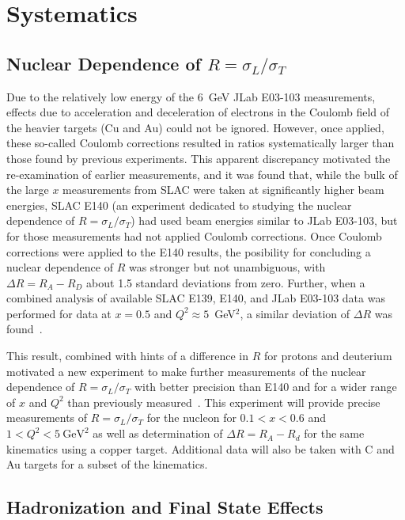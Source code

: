 \section{Systematics\label{sec:systematics}}
\subsection{Nuclear Dependence of $R=\sigma_L/\sigma_T$}


Due to the relatively low energy of the 6~GeV JLab E03-103 measurements, effects due to acceleration and
deceleration of electrons in the Coulomb field of the heavier targets (Cu and Au) could not be ignored.
However, once applied, these so-called Coulomb corrections resulted in ratios systematically larger
than those found by previous experiments.  This apparent discrepancy motivated the re-examination of
earlier measurements, and it was found that, while the bulk of the large $x$ measurements from SLAC
were taken at significantly higher beam energies, SLAC E140 (an experiment dedicated to studying
the nuclear dependence of $R=\sigma_L/\sigma_T$) had used beam energies similar to JLab E03-103, but for
those measurements had not applied Coulomb corrections.  Once Coulomb corrections were applied to the E140
results, the posibility for concluding a nuclear dependence of $R$ was stronger but not unambiguous, with
$\Delta R=R_A-R_D$ about 1.5 standard deviations from zero. Further, when a combined analysis
of available SLAC E139, E140, and JLab E03-103 data was performed for data at $x=0.5$ and $Q^2\approx5$~GeV$^2$,
a similar deviation of $\Delta R$ was found~\cite{Solvignon:2009it}.

This result, combined with hints of a difference in $R$ for protons and deuterium motivated a 
new experiment to make further measurements of the nuclear dependence of $R=\sigma_L/\sigma_T$
with better precision than E140 and for a wider range of $x$ and $Q^2$ than previously
measured~\cite{12gev_nucr}.  This experiment will provide precise measurements of $R=\sigma_L/\sigma_T$
for the nucleon for $0.1<x<0.6$ and $1<Q^2<5~\mathrm{GeV}^2$ as well as determination of $\Delta R= R_A-R_d$ for the same
kinematics using a copper target. Additional data will also be taken with C and Au targets for a subset
of the kinematics.


\subsection{Hadronization and Final State Effects}

